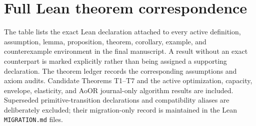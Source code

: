 \providecommand{\LeanName}[1]{\nolinkurl{#1}}
\section{Full Lean theorem correspondence}\label{supp:lean-correspondence}

The table lists the exact Lean declaration attached to every active
definition, assumption, lemma, proposition, theorem, corollary, example, and
counterexample environment in the final manuscript.  A result without an
exact counterpart is marked explicitly rather than being assigned a
supporting declaration.  The theorem ledger records the corresponding
assumptions and axiom audits.  Candidate Theorems T1--T7 and the active
optimization, capacity, envelope, elasticity, and AoOR journal-only algorithm
results are included.
Superseded primitive-transition declarations and compatibility aliases are
deliberately excluded; their migration-only record is maintained in the Lean
\texttt{MIGRATION.md} files.

